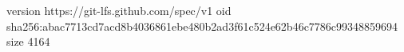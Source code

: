 version https://git-lfs.github.com/spec/v1
oid sha256:abac7713cd7acd8b4036861ebe480b2ad3f61c524e62b46c7786c99348859694
size 4164
